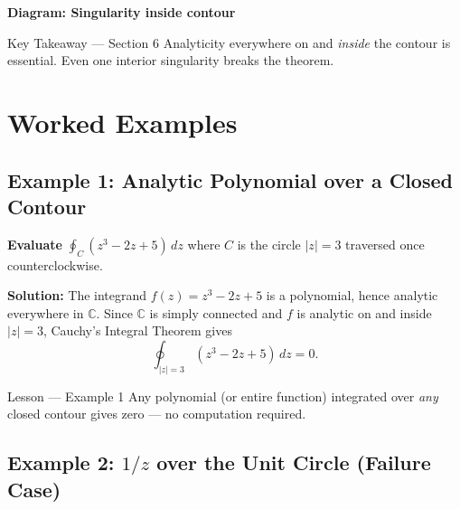 \documentclass[12pt,a4paper]{article}
\begin{document}
\medskip
\noindent\textbf{Diagram: Singularity inside contour}

\begin{center}
\end{center}

\begin{learnbox}{Key Takeaway --- Section 6}
Analyticity everywhere on and \emph{inside} the contour is essential.
Even one interior singularity breaks the theorem.
\end{learnbox}

\section{Worked Examples}

\subsection*{Example 1: Analytic Polynomial over a Closed Contour}

\textbf{Evaluate} $\displaystyle\oint_{C} (z^3 - 2z + 5)\,dz$
where $C$ is the circle $|z| = 3$ traversed once counterclockwise.

\textbf{Solution:}
The integrand $f(z) = z^3 - 2z + 5$ is a polynomial, hence analytic everywhere in $\mathbb{C}$.
Since $\mathbb{C}$ is simply connected and $f$ is analytic on and inside $|z| = 3$,
Cauchy's Integral Theorem gives
\[
  \oint_{|z|=3} (z^3 - 2z + 5)\,dz = 0.
\]

\begin{learnbox}{Lesson --- Example 1}
Any polynomial (or entire function) integrated over \emph{any} closed contour gives zero ---
no computation required.
\end{learnbox}

\subsection*{Example 2: $1/z$ over the Unit Circle (Failure Case)}
\end{document}
